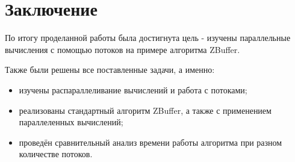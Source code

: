 \chapter*{Заключение}
По итогу проделанной работы была достигнута цель - изучены параллельные вычисления с помощью потоков на примере алгоритма ZBuffer.

Также были решены все поставленные задачи, а именно:

\begin{itemize}
	\item изучены распараллеливание вычислений и работа с потоками;
	\item реализованы стандартный алгоритм ZBuffer, а также с применением параллеленных вычислений;
	\item проведён сравнительный анализ времени работы алгоритма при разном количестве потоков.
\end{itemize}